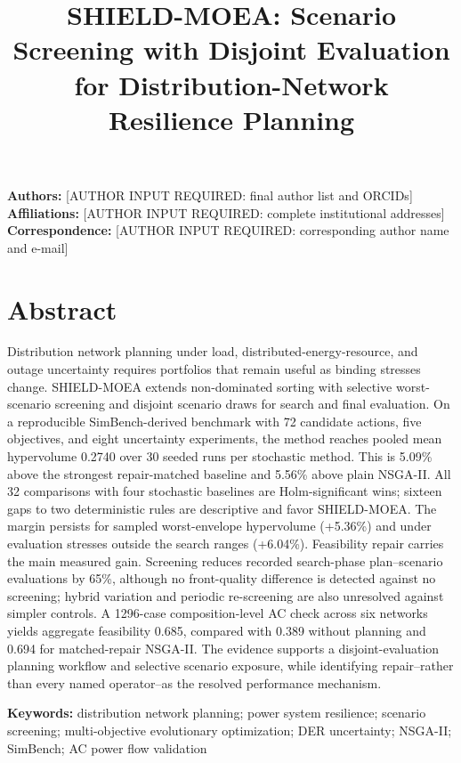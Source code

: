 \documentclass[
  10pt,
  a4paper,
]{article}
\title{SHIELD-MOEA: Scenario Screening with Disjoint Evaluation for
Distribution-Network Resilience Planning}
\author{}
\date{}
\begin{document}
\maketitle

{
\hypersetup{linkcolor=}
\setcounter{tocdepth}{3}
\tableofcontents
}
\textbf{Authors:} {[}AUTHOR INPUT REQUIRED: final author list and
ORCIDs{]} \textbf{Affiliations:} {[}AUTHOR INPUT REQUIRED: complete
institutional addresses{]} \textbf{Correspondence:} {[}AUTHOR INPUT
REQUIRED: corresponding author name and e-mail{]}

\section{Abstract}\label{abstract}

Distribution network planning under load, distributed-energy-resource,
and outage uncertainty requires portfolios that remain useful as binding
stresses change. SHIELD-MOEA extends non-dominated sorting with
selective worst-scenario screening and disjoint scenario draws for
search and final evaluation. On a reproducible SimBench-derived
benchmark with 72 candidate actions, five objectives, and eight
uncertainty experiments, the method reaches pooled mean hypervolume
0.2740 over 30 seeded runs per stochastic method. This is 5.09\% above
the strongest repair-matched baseline and 5.56\% above plain NSGA-II.
All 32 comparisons with four stochastic baselines are Holm-significant
wins; sixteen gaps to two deterministic rules are descriptive and favor
SHIELD-MOEA. The margin persists for sampled worst-envelope hypervolume
(+5.36\%) and under evaluation stresses outside the search ranges
(+6.04\%). Feasibility repair carries the main measured gain. Screening
reduces recorded search-phase plan--scenario evaluations by 65\%,
although no front-quality difference is detected against no screening;
hybrid variation and periodic re-screening are also unresolved against
simpler controls. A 1296-case composition-level AC check across six
networks yields aggregate feasibility 0.685, compared with 0.389 without
planning and 0.694 for matched-repair NSGA-II. The evidence supports a
disjoint-evaluation planning workflow and selective scenario exposure,
while identifying repair--rather than every named operator--as the
resolved performance mechanism.

\textbf{Keywords:} distribution network planning; power system
resilience; scenario screening; multi-objective evolutionary
optimization; DER uncertainty; NSGA-II; SimBench; AC power flow
validation
\end{document}
